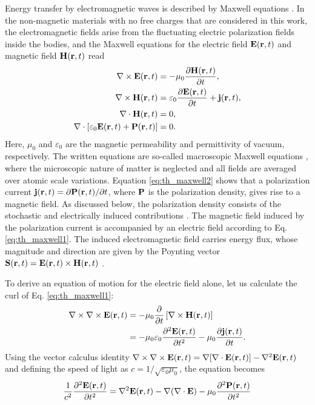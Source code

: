 Energy transfer by electromagnetic waves is described by Maxwell equations \cite{jackson}. In the non-magnetic materials with no free charges that are considered in this work, the electromagnetic fields arise from the fluctuating electric polarization fields inside the bodies, and the Maxwell equations for the electric field $\mathbf{E}(\mathbf{r},t)$ and magnetic field $\mathbf{H}(\mathbf{r},t)$ read \cite{novotny}
\begin{subequations}
\begin{align}
  \nabla \times \mathbf{E}(\mathbf{r},t) &= - \mu_0 \frac{\partial \mathbf{H}(\mathbf{r},t)}{\partial t}, \label{eq:th_maxwell1} \\
  \nabla \times \mathbf{H}(\mathbf{r},t) &= \varepsilon_0 \frac{\partial \mathbf{E}(\mathbf{r},t)}{\partial t} + \mathbf{j}(\mathbf{r},t) , \label{eq:th_maxwell2} \\
   \nabla \cdot \mathbf{H}(\mathbf{r},t) &= 0, \\
   \nabla \cdot \left[\varepsilon_0 \mathbf{E}(\mathbf{r},t)+\mathbf{P}(\mathbf{r},t)\right] &= 0.
\end{align}
\end{subequations}
Here, $\mu_0$ and $\varepsilon_0$ are the magnetic permeability and permittivity of vacuum, respectively. The written equations are so-called macroscopic Maxwell equations \cite{novotny}, where the microscopic nature of matter is neglected and all fields are averaged over atomic scale variations. Equation \eqref{eq:th_maxwell2} shows that a polarization current $\mathbf{j}(\mathbf{r},t)=\partial \mathbf{P}(\mathbf{r},t)/\partial t$, where $\mathbf{P}$ is the polarization density, gives rise to a magnetic field. As discussed below, the polarization density consists of the stochastic and electrically induced contributions \cite{benabdallah11}. The magnetic field induced by the polarization current is accompanied by an electric field according to Eq. \eqref{eq:th_maxwell1}. The induced electromagnetic field carries energy flux, whose magnitude and direction are given by the Poynting vector $\mathbf{S}(\mathbf{r},t)=\mathbf{E}(\mathbf{r},t)\times \mathbf{H}(\mathbf{r},t)$ \cite{novotny}.

To derive an equation of motion for the electric field alone, let us calculate the curl of Eq. \eqref{eq:th_maxwell1}:
\begin{alignat}{2}
 \nabla \times \nabla \times \mathbf{E}(\mathbf{r},t) &= - \mu_0 \frac{\partial}{\partial t} \left[\nabla \times \mathbf{H}(\mathbf{r},t) \right] \\
  &= - \mu_0 \varepsilon_0 \frac{\partial ^2\mathbf{E}(\mathbf{r},t)}{\partial t^2} - \mu_0 \frac{\partial \mathbf{j}(\mathbf{r},t)}{\partial t}. \label{eq:th_curlcurlE}
 \end{alignat}
Using the vector calculus identity $\nabla \times \nabla \times \mathbf{E}(\mathbf{r},t)=\nabla [\nabla \cdot \mathbf{E}(\mathbf{r},t)]-\nabla ^2\mathbf{E}(\mathbf{r},t)$ and defining the speed of light as $c=1/\sqrt{\varepsilon_0 \mu_0}$, the equation becomes
\begin{equation}
\frac{1}{c^2} \frac{\partial ^2\mathbf{E}(\mathbf{r},t)}{\partial t^2} = \nabla^2 \mathbf{E}(\mathbf{r},t) -\nabla (\nabla \cdot \mathbf{E})  - \mu_0 \frac{\partial^2 \mathbf{P}(\mathbf{r},t)}{\partial t^2} \label{eq:th_eom_photons}
\end{equation}

